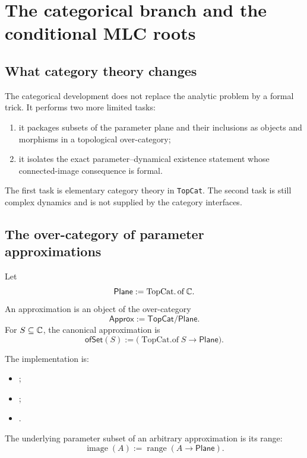\chapter{The categorical branch and the conditional MLC roots}

\section{What category theory changes}

The categorical development does not replace the analytic problem by a
formal trick.  It performs two more limited tasks:
\begin{enumerate}
\item it packages subsets of the parameter plane and their inclusions as
      objects and morphisms in a topological over-category;
\item it isolates the exact parameter--dynamical existence statement whose
      connected-image consequence is formal.
\end{enumerate}
The first task is elementary category theory in \texttt{TopCat}.  The second
task is still complex dynamics and is not supplied by the category
interfaces.

\section{The over-category of parameter approximations}

\begin{definition}
\label{def:categorical-approximation}
Let
\[
 \mathsf{Plane}:=\operatorname{TopCat.of}\mathbb C.
\]
An approximation is an object of the over-category
\[
 \mathsf{Approx}:=\mathsf{TopCat}/\mathsf{Plane}.
\]
For $S\subseteq\mathbb C$, the canonical approximation is
\[
 \mathsf{ofSet}(S):=
 \bigl(\operatorname{TopCat.of}S\longrightarrow\mathsf{Plane}\bigr).
\]
\end{definition}

The implementation is:
\begin{itemize}
\item {};
\item {};
\item {}.
\end{itemize}
The underlying parameter subset of an arbitrary approximation is its range:
\[
 \operatorname{image}(A):=
 \operatorname{range}(A\to\mathsf{Plane}).
\]

